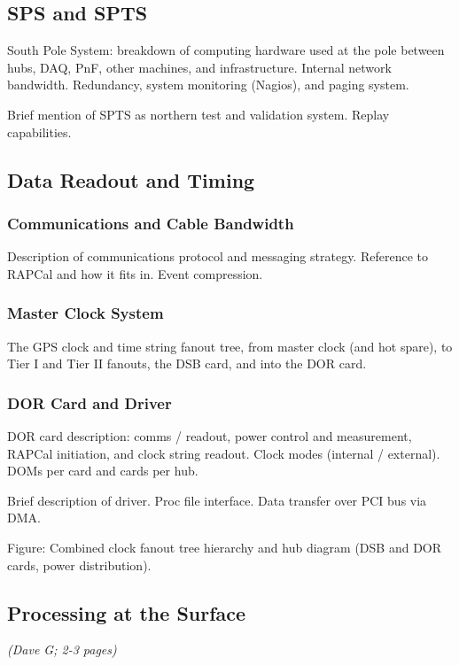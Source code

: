 \subsection{SPS and SPTS}

South Pole System: breakdown of computing hardware used at the pole between
hubs, DAQ, PnF, other machines, and infrastructure.  Internal network
bandwidth.  Redundancy, system monitoring (Nagios), and paging system.

Brief mention of SPTS as northern test and validation system.  Replay
capabilities.

\subsection{Data Readout and Timing}
\subsubsection{Communications and Cable Bandwidth}

Description of communications protocol and messaging strategy.  Reference
to RAPCal and how it fits in.  Event compression.


\subsubsection{Master Clock System}

The GPS clock and time string fanout tree, from master clock (and hot
spare), to Tier I and Tier II fanouts, the DSB card, and into the DOR card.

\subsubsection{DOR Card and Driver}

DOR card description: comms / readout, power control and measurement,
RAPCal initiation, and clock string readout.  Clock modes (internal /
external).  DOMs per card and cards per hub.

Brief description of driver.  Proc file interface.  Data transfer over PCI
bus via DMA.

Figure: Combined clock fanout tree hierarchy and hub diagram (DSB and DOR
cards, power distribution).

\subsection{Processing at the Surface}
\textsl{(Dave G; 2-3 pages)}

